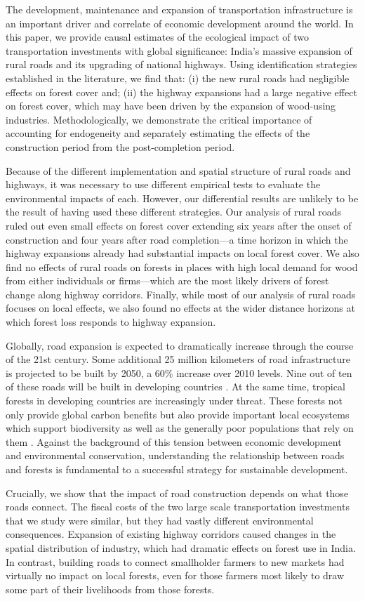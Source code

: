 
The development, maintenance and expansion of transportation
infrastructure is an important driver and correlate of economic
development around the world. In this paper, we provide causal
estimates of the ecological impact of two transportation investments
with global significance: India's massive expansion of rural roads and
its upgrading of national highways. Using identification strategies
established in the literature, we find that: (i) the new rural roads
had negligible effects on forest cover and; (ii) the highway
expansions had a large negative effect on forest cover, which may have
been driven by the expansion of wood-using
industries. Methodologically, we demonstrate the critical importance
of accounting for endogeneity and separately estimating the effects of
the construction period from the post-completion period.

Because of the different implementation and spatial structure of rural
roads and highways, it was necessary to use different empirical tests
to evaluate the environmental impacts of each. However, our
differential results are unlikely to be the result of having used
these different strategies. Our analysis of rural roads ruled out
even small effects on forest cover extending six years after the onset
of construction and four years after road completion---a time horizon
in which the highway expansions already had substantial impacts on
local forest cover. We also find no effects of rural roads on forests
in places with high local demand for wood from either individuals or
firms---which are the most likely drivers of forest change along
highway corridors. Finally, while most of our analysis of rural roads
focuses on local effects, we also found no effects at the wider
distance horizons at which forest loss responds to highway expansion.

Globally, road expansion is expected to dramatically increase through
the course of the 21st century. Some additional 25 million kilometers
of road infrastructure is projected to be built by 2050, a 60\%
increase over 2010 levels. Nine out of ten of these roads will be
built in developing countries \cite{WL14}. At the same time, tropical
forests in developing countries are increasingly under threat. These
forests not only provide global carbon benefits but also provide
important local ecosystems which support biodiversity as well as the
generally poor populations that rely on them \cite{BGM16}. Against the
background of this tension between economic development and
environmental conservation, understanding the relationship between
roads and forests is fundamental to a successful strategy for
sustainable development.

Crucially, we show that the impact of road construction depends on
what those roads connect.  The fiscal costs of the two large scale
transportation investments that we study were similar, but they had
vastly different environmental consequences.  Expansion of existing
highway corridors caused changes in the spatial distribution of
industry, which had dramatic effects on forest use in India.  In
contrast, building roads to connect smallholder farmers to new
markets had virtually no impact on local forests, even for those
farmers most likely to draw some part of their livelihoods from those
forests. 

